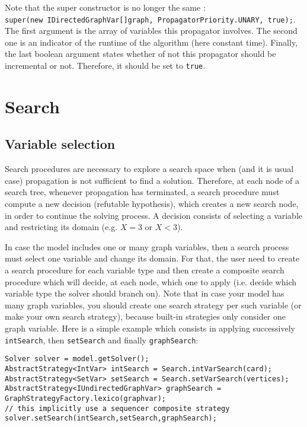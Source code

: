 \documentclass{article}
\begin{document}
Note that the super constructor is no longer the same : \\
\texttt{super(new IDirectedGraphVar[]{graph}, PropagatorPriority.UNARY, true);}. 
The first argument is the array of variables this propagator involves. The second one is an indicator of the runtime of the algorithm (here constant time). Finally, the last boolean argument states whether of not this propagator should be incremental or not. Therefore, it should be set to \texttt{true}.

\newpage{}
\section{Search}

\subsection{Variable selection}

Search procedures are necessary to explore a search space when (and it is usual case) propagation is not sufficient to find a solution. 
Therefore, at each node of a search tree, whenever propagation has terminated, a search procedure must compute a new decision (refutable hypothesis), which creates a new search node, in order to continue the solving process. A decision consists of selecting a variable and restricting its domain (e.g. $X=3$ or $X<3$). 

In case the model includes one or many graph variables, then a search process must select one variable and change its domain. 
For that, the user need to create a search procedure for each variable type and then create a composite search procedure which will decide, at each node, which one to apply (i.e. decide which variable type the solver should branch on). Note that in case your model has many graph variables, you should create one search strategy per such variable (or make your own search strategy), because built-in strategies only consider one graph variable. Here is a simple example which consists in applying successively \texttt{intSearch}, then \texttt{setSearch} and finally \texttt{graphSearch}:

\begin{lstlisting}
Solver solver = model.getSolver();
AbstractStrategy<IntVar> intSearch = Search.intVarSearch(card);
AbstractStrategy<SetVar> setSearch = Search.setVarSearch(vertices);
AbstractStrategy<IUndirectedGraphVar> graphSearch = GraphStrategyFactory.lexico(graphvar);
// this implicitly use a sequencer composite strategy
solver.setSearch(intSearch,setSearch,graphSearch); 
\end{lstlisting}
\end{document}

